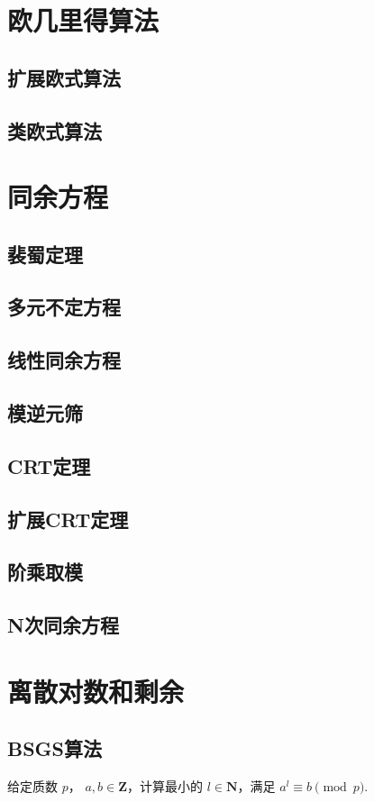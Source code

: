 \documentclass[12pt,a4paper]{article}
\begin{document}
\newpage
\section{欧几里得算法}
\subsection{扩展欧式算法} %
\subsection{类欧式算法}

\newpage
\section{同余方程}
\subsection{裴蜀定理}
\subsection{多元不定方程}
\subsection{线性同余方程}
\subsection{模逆元筛}
\subsection{CRT定理}
\subsection{扩展CRT定理}
\subsection{阶乘取模}
\subsection{N次同余方程}

\newpage
\section{离散对数和剩余}
\subsection{BSGS算法}
\begin{mdframed}[leftline=true, linewidth=2pt, linecolor=gray]
	给定质数 $p$， $a,b\in \mathbf{Z}$，计算最小的 $l\in\mathbf{N}$，满足 $a^l \equiv b \pmod p$.
\end{mdframed}
\end{document}
